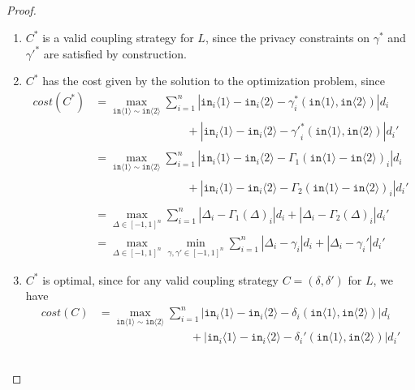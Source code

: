 \documentclass[12pt]{article}
\newcommand{\brangle}[1]{\langle #1 \rangle}
\theoremstyle{definition}
\begin{document}
\begin{proof}
    \begin{enumerate}
        \item $C^*$ is a valid coupling strategy for $L$, since the privacy constraints on $\gamma^*$ and ${\gamma'}^*$ are satisfied by construction.
        \item $C^*$ has the cost given by the solution to the optimization problem, since 
        \begin{align*}
            cost(C^*) &= \max_{\texttt{in}\brangle{1}\sim \texttt{in}\brangle{2}} \sum_{i = 1}^n  |\texttt{in}_i\brangle{1} - \texttt{in}_i\brangle{2} - \gamma_i^*(\texttt{in}\brangle{1}, \texttt{in}\brangle{2})| d_i \\ 
            \phantom{cost(C^*)} &\phantom{=\max_{\texttt{in}\brangle{1}\sim \texttt{in}\brangle{2}}\qquad } + |\texttt{in}_i\brangle{1} - \texttt{in}_i\brangle{2} - {\gamma'}_i^*(\texttt{in}\brangle{1}, \texttt{in}\brangle{2})|d_i' \\
            &= \max_{\texttt{in}\brangle{1}\sim \texttt{in}\brangle{2}} \sum_{i = 1}^n  |\texttt{in}_i\brangle{1} - \texttt{in}_i\brangle{2} - \Gamma_1(\texttt{in}\brangle{1} - \texttt{in}\brangle{2})_i| d_i \\ 
            \phantom{cost(C^*)} &\phantom{=\max_{\texttt{in}\brangle{1}\sim \texttt{in}\brangle{2}}\qquad } + |\texttt{in}_i\brangle{1} - \texttt{in}_i\brangle{2} - \Gamma_2(\texttt{in}\brangle{1} - \texttt{in}\brangle{2})_i|d_i' \\
            &= \max_{\Delta \in [-1, 1]^n} \sum_{i = 1}^n  |\Delta_i - \Gamma_1(\Delta)_i| d_i + |\Delta_i - \Gamma_2(\Delta)_i|d_i' \\
            &= \max_{\Delta \in [-1, 1]^n} \min_{\gamma, \gamma' \in [-1, 1]^n} \sum_{i = 1}^n  |\Delta_i - \gamma_i| d_i + |\Delta_i - \gamma_i'|d_i'
        \end{align*}
        \item $C^*$ is optimal, since for any valid coupling strategy $C = (\delta, \delta')$ for $L$, we have
        \begin{align*}
            cost(C) &= \max_{\texttt{in}\brangle{1}\sim \texttt{in}\brangle{2}} \sum_{i = 1}^n  |\texttt{in}_i\brangle{1} - \texttt{in}_i\brangle{2} - \delta_i(\texttt{in}\brangle{1}, \texttt{in}\brangle{2})| d_i \\
            \phantom{cost(C)} &\phantom{=\max_{\texttt{in}\brangle{1}\sim \texttt{in}\brangle{2}}\qquad } + |\texttt{in}_i\brangle{1} - \texttt{in}_i\brangle{2} - \delta_i'(\texttt{in}\brangle{1}, \texttt{in}\brangle{2})|d_i' \\

\end{align*}
\end{enumerate}
\end{proof}
\end{document}
